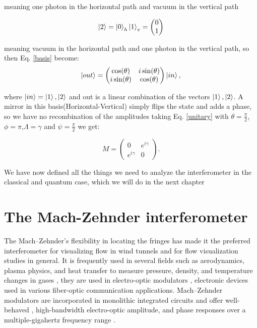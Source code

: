 \documentclass{book}
\begin{document}
 meaning one photon in the horizontal path and vacuum in the vertical path
 
 \begin{equation}
 \ket{2}=\ket{0}_{h}\ket{1}_{v}=\begin{pmatrix} 0 \\1 \end{pmatrix}
 \end{equation}
 
meaning vacuum  in the horizontal path and one photon in the vertical path, so then Eq. \ref{basis} become:
\begin{equation}
\ket{out}=\begin{pmatrix} \cos(\theta) & i \sin(\theta) \\ i \sin(\theta) & \cos(\theta) \end{pmatrix} \ket{in},
\end{equation}

where $\ket{in}=\ket{1},\ket{2}$ and out is a linear combination of the vectors $\ket{1},\ket{2}$. A mirror in this basis(Horizontal-Vertical) simply flips the state and adds a phase, so we have no recombination of the amplitudes taking Eq. \ref{unitary} with $\theta=\frac{\pi}{2}$,$\phi=\pi$,$\Lambda=\gamma$ and $\psi= \frac{\pi}{2} $ we get:

 
\begin{equation}
M=\begin{pmatrix} 0& e^{i\gamma}  \\ e^{i\gamma} & 0 \end{pmatrix}.
\end{equation}

We have now defined all the things we need to analyze the interferometer in the classical and quantum case, which we will do in the next chapter

\pagebreak
\chapter{The Mach-Zehnder interferometer }


 The Mach–Zehnder's flexibility in locating the fringes has made it the preferred interferometer for visualizing flow in wind tunnels \cite{10} and for flow visualization studies in general. It is frequently used in several fields such as aerodynamics, plasma physics, and heat transfer to measure pressure, density, and temperature changes in gases \cite{11}, they are used in electro-optic modulators \cite{ackerman}, electronic devices used in various fiber-optic communication applications. Mach–Zehnder modulators are incorporated in monolithic integrated circuits and offer well-behaved \cite{studenkov}, high-bandwidth electro-optic amplitude, and phase responses over a multiple-gigahertz frequency range \cite{capmany}.
\end{document}
